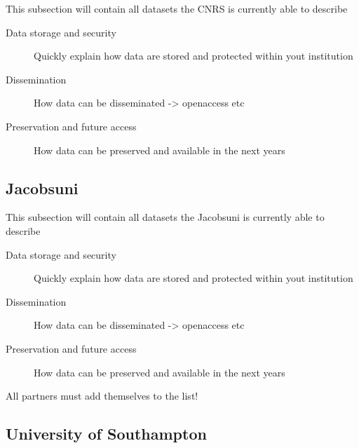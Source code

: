 \documentclass[12pt]{amsbook}
\begin{document}
This subsection will contain all datasets the CNRS is currently able to describe
\begin{description}
\item[Data storage and security] Quickly explain how data are stored and protected within yout institution
\item[Dissemination] How data can be disseminated -> openaccess etc
\item[Preservation and future access] How data can be preserved and available in the next years
\end{description}


\subsection{Jacobsuni}



This subsection will contain all datasets the Jacobsuni is currently able to describe
\begin{description}
\item[Data storage and security] Quickly explain how data are stored and protected within yout institution
\item[Dissemination] How data can be disseminated -> openaccess etc
\item[Preservation and future access] How data can be preserved and available in the next years
\end{description}


All partners must add themselves to the list!


\subsection{University of Southampton}
\end{document}
